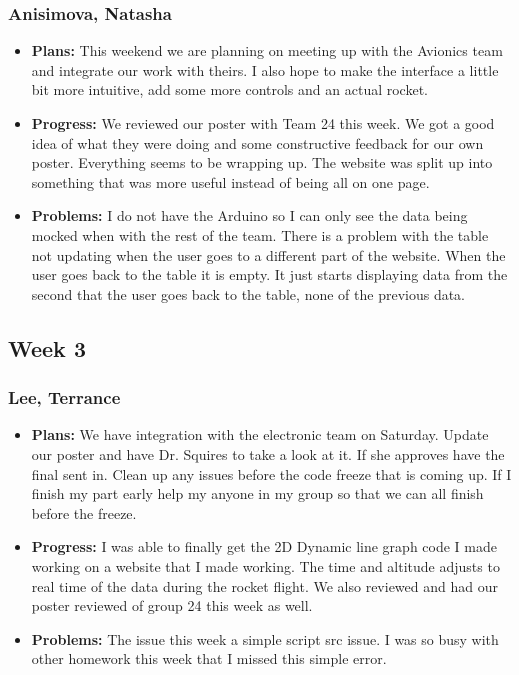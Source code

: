 \documentclass[10pt,draftclsnofoot,onecolumn]{IEEEtran}
\begin{document}
\subsubsection{Anisimova, Natasha}
\begin{itemize}
	\item \textbf{Plans: }
	This weekend we are planning on meeting up with the Avionics team and integrate our work with theirs. I also hope to make the interface a little bit more intuitive, add some more controls and an actual rocket.
	\item \textbf{Progress:  }
	We reviewed our poster with Team 24 this week. We got a good idea of what they were doing and some constructive feedback for our own poster. Everything seems to be wrapping up. The website was split up into something that was more useful instead of being all on one page.
	\item \textbf{Problems: }
	I do not have the Arduino so I can only see the data being mocked when with the rest of the team. There is a problem with the table not updating when the user goes to a different part of the website. When the user goes back to the table it is empty. It just starts displaying data from the second that the user goes back to the table, none of the previous data.
\end{itemize}

\subsection{Week 3}
\subsubsection{Lee, Terrance}
\begin{itemize}
	\item \textbf{Plans: }
	We have integration with the electronic team on Saturday. Update our poster and have Dr. Squires to take a look at it. If she approves have the final sent in. Clean up any issues before the code freeze that is coming up. If I finish my part early help my anyone in my group so that we can all finish before the freeze.
	\item \textbf{Progress:  }
	I was able to finally get the 2D Dynamic line graph code I made working on a website that I made working. The time and altitude adjusts to real time of the data during the rocket flight. We also reviewed and had our poster reviewed of group 24 this week as well.
	\item \textbf{Problems: }
	The issue this week a simple script src issue. I was so busy with other homework this week that I missed this simple error.
\end{itemize}
\end{document}

